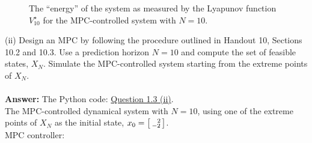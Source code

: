 \documentclass[a4paper,11pt,reqno]{amsart}
\begin{document}
\begin{figure}[H] %
    \raggedright
    \captionsetup{justification   = raggedright,
              singlelinecheck = false}
    \caption{The ``energy'' of the system as measured by the Lyapunov function $V^{\star}_{10}$ for the MPC-controlled system with $N = 10$.}
    \label{fig:q3_i_cost}
\end{figure}
\noindent(ii) Design an MPC by following the procedure outlined in Handout 10, Sections 10.2 and 10.3. Use
a prediction horizon $N=10$ and compute the set of feasible states, $X_N$. Simulate the MPC-controlled
system starting from the extreme points of $X_N$.
\\ \\
\textbf{Answer:} 
The Python code: \href{https://github.com/Gczmy/ELE8088/blob/main/Coursework1/Python_code/3_ii.py}{Question 1.3 (ii)}.
\\
The MPC-controlled dynamical system with $N=10$, using one of the extreme points of $X_N$ as the initial state, $x_0=\begin{bsmallmatrix}\ \ 2\\-2\end{bsmallmatrix}$.
\\
MPC controller:
\end{document}

